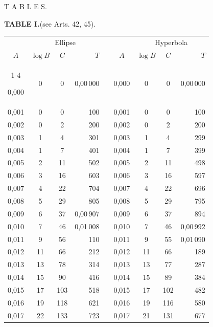 \clearpage
{}
\thispagestyle{empty}
\vspace*{2.5in}
\begin{center}{\Large T A B L E S.}\end{center}
\clearpage
{}
\begingroup
\centering
\fontsize{9}{9}\selectfont
\setlength{\tabcolsep}{6pt}
\renewcommand{\arraystretch}{1}
\setlength{\parskip}{0pt}
\textbf{TABLE I.}\quad (see Arts. 42, 45).
\par\vspace{7pt}
\begin{tabular}{|c|c|c|r|@{}p{9pt}@{}|c|c|c|r|}
\hline
\rule{0pt}{8.5pt} & \multicolumn{3}{c|}{Ellipse} & & & \multicolumn{3}{c|}{Hyperbola} \\
\(A\) & \(\log B\) & \(C\) & \(T\) & & \(A\) & \(\log B\) & \(C\) & \(T\) \\
\cline{1-4}\cline{6-9}
\rule{0pt}{8.5pt}0,000 & 0 & 0 & 0,00\,000 &  & 0,000 & 0 & 0 & 0,00\,000 \\
0,001 & 0 & 0 & 100 &  & 0,001 & 0 & 0 & 100 \\
0,002 & 0 & 2 & 200 &  & 0,002 & 0 & 2 & 200 \\
0,003 & 1 & 4 & 301 &  & 0,003 & 1 & 4 & 299 \\
0,004 & 1 & 7 & 401 &  & 0,004 & 1 & 7 & 399 \\
0,005 & 2 & 11 & 502 &  & 0,005 & 2 & 11 & 498 \\[3pt]
0,006 & 3 & 16 & 603 &  & 0,006 & 3 & 16 & 597 \\
0,007 & 4 & 22 & 704 &  & 0,007 & 4 & 22 & 696 \\
0,008 & 5 & 29 & 805 &  & 0,008 & 5 & 29 & 795 \\
0,009 & 6 & 37 & 0,00\,907 &  & 0,009 & 6 & 37 & 894 \\
0,010 & 7 & 46 & 0,01\,008 &  & 0,010 & 7 & 46 & 0,00\,992 \\[3pt]
0,011 & 9 & 56 & 110 &  & 0,011 & 9 & 55 & 0,01\,090 \\
0,012 & 11 & 66 & 212 &  & 0,012 & 11 & 66 & 189 \\
0,013 & 13 & 78 & 314 &  & 0,013 & 13 & 77 & 287 \\
0,014 & 15 & 90 & 416 &  & 0,014 & 15 & 89 & 384 \\
0,015 & 17 & 103 & 518 &  & 0,015 & 17 & 102 & 482 \\[3pt]
0,016 & 19 & 118 & 621 &  & 0,016 & 19 & 116 & 580 \\
0,017 & 22 & 133 & 723 &  & 0,017 & 21 & 131 & 677 \\

\end{tabular}
